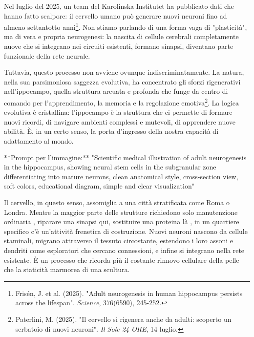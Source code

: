 Nel luglio del 2025, un team del Karolinska Institutet ha pubblicato dati che hanno fatto scalpore: il cervello umano può generare nuovi neuroni fino ad almeno settantotto anni\footnote{Frisén, J. et al. (2025). "Adult neurogenesis in human hippocampus persists across the lifespan". \textit{Science}, 376(6590), 245-252.}. Non stiamo parlando di una forma vaga di "plasticità", ma di vera e propria neurogenesi: la nascita di cellule cerebrali completamente nuove che si integrano nei circuiti esistenti, formano sinapsi, diventano parte funzionale della rete neurale.

Tuttavia, questo processo non avviene ovunque indiscriminatamente. La natura, nella sua parsimoniosa saggezza evolutiva, ha concentrato gli sforzi rigenerativi nell'ippocampo, quella struttura arcuata e profonda che funge da centro di comando per l'apprendimento, la memoria e la regolazione emotiva\footnote{Paterlini, M. (2025). "Il cervello si rigenera anche da adulti: scoperto un serbatoio di nuovi neuroni". \textit{Il Sole 24 ORE}, 14 luglio.}. La logica evolutiva è cristallina: l'ippocampo è la struttura che ci permette di formare nuovi ricordi, di navigare ambienti complessi e mutevoli, di apprendere nuove abilità. È, in un certo senso, la porta d'ingresso della nostra capacità di adattamento al mondo.

\begin{center}  
  \label{fig:neurogenesi_schema}  
\end{center}

**Prompt per l'immagine:** "Scientific medical illustration of adult neurogenesis in the hippocampus, showing neural stem cells in the subgranular zone differentiating into mature neurons, clean anatomical style, cross-section view, soft colors, educational diagram, simple and clear visualization"

Il cervello, in questo senso, assomiglia a una città stratificata come Roma o Londra. Mentre la maggior parte delle strutture richiedono solo manutenzione ordinaria , riparare una sinapsi qui, sostituire una proteina là , in un quartiere specifico c'è un'attività frenetica di costruzione. Nuovi neuroni nascono da cellule staminali, migrano attraverso il tessuto circostante, estendono i loro assoni e dendriti come esploratori che cercano connessioni, e infine si integrano nella rete esistente. È un processo che ricorda più il costante rinnovo cellulare della pelle che la staticità marmorea di una scultura.

